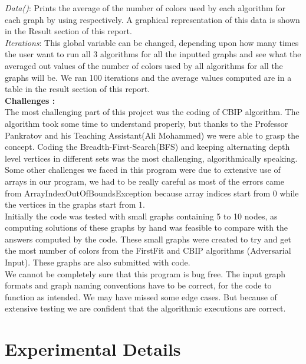 \documentclass{article}
\begin{document}
\textit{Data()}: Prints the average of the number of colors used by each algorithm for each graph by using respectively. A graphical representation 
of this data is shown in the Result section of this report.\\

\textit{Iterations}: This global variable can be changed, depending upon how many times the user want to run all 3 algorithms for all the inputted 
graphs and see what the averaged out values of the number of colors used by all algorithms for all the graphs will be. We ran 100 iterations and the 
average values computed are in a table in the result section of this report.\\

\textbf{Challenges :}\\

The most challenging part of this project was the coding of CBIP algorithm. The algorithm took some time to understand properly, but thanks to the
 Professor Pankratov and his Teaching Assistant(Ali Mohammed) we were able to grasp the concept. Coding the Breadth-First-Search(BFS)  
and keeping alternating depth level vertices in different sets was the most challenging, algorithmically speaking. \\

Some other challenges we faced in this program were due to extensive use of arrays in our program, we had to be really careful as most of the errors
 came from ArrayIndexOutOfBoundsException because array indices start from 0 while the vertices in the graphs start from 1.\\

Initially the code was tested with small graphs containing 5 to 10 nodes, as computing solutions of these graphs by hand was feasible to compare
 with the answers computed by the code. These small graphs were created to try and get the most number of colors from the FirstFit and CBIP algorithms (Adversarial Input). These graphs are also submitted with code.\\ 

We cannot be completely sure that this program is bug free. The input graph formats and graph naming conventions have to be correct, for the 
code to function as intended. We may have missed some edge cases. But because of extensive testing we are confident that the
 algorithmic executions are correct. 

\section{Experimental Details}
\end{document}
